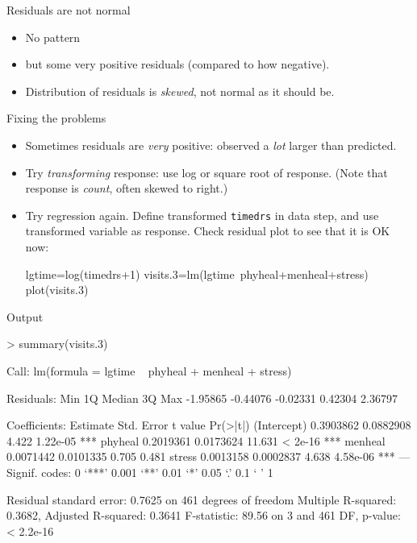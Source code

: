 \begin{frame}{Residuals are not normal}

  \begin{itemize}
  \item No pattern
  \item but some very positive residuals (compared to
how negative).
\item Distribution of residuals is {\em skewed}, not
normal as it should be.
  \end{itemize}
\end{frame}


\begin{frame}[fragile]{Fixing the problems}

  \begin{itemize}
  \item Sometimes residuals are {\em very} positive: observed a {\em lot} larger than predicted.
  \item Try {\em  transforming} response: use log or square root of response. (Note that response is {\em count}, often skewed to right.)
  \item Try regression again. Define transformed \verb-timedrs- in data step, and use transformed variable as response. Check residual plot to see that it is OK now:

{\footnotesize
\begin{semiverbatim}
lgtime=log(timedrs+1)
visits.3=lm(lgtime~phyheal+menheal+stress)
plot(visits.3)
\end{semiverbatim}
}
  \end{itemize}
  
\end{frame}


\begin{frame}[fragile]{Output}
  
{\scriptsize
\begin{semiverbatim}
> summary(visits.3)

Call:
lm(formula = lgtime ~ phyheal + menheal + stress)

Residuals:
     Min       1Q   Median       3Q      Max 
-1.95865 -0.44076 -0.02331  0.42304  2.36797 

Coefficients:
             Estimate Std. Error t value Pr(>|t|)    
(Intercept) 0.3903862  0.0882908   4.422 1.22e-05 ***
phyheal     0.2019361  0.0173624  11.631  < 2e-16 ***
menheal     0.0071442  0.0101335   0.705    0.481    
stress      0.0013158  0.0002837   4.638 4.58e-06 ***
---
Signif. codes:  0 ‘***’ 0.001 ‘**’ 0.01 ‘*’ 0.05 ‘.’ 0.1 ‘ ’ 1 

Residual standard error: 0.7625 on 461 degrees of freedom
Multiple R-squared: 0.3682,	Adjusted R-squared: 0.3641 
F-statistic: 89.56 on 3 and 461 DF,  p-value: < 2.2e-16 

\end{semiverbatim}
}

\end{frame}

